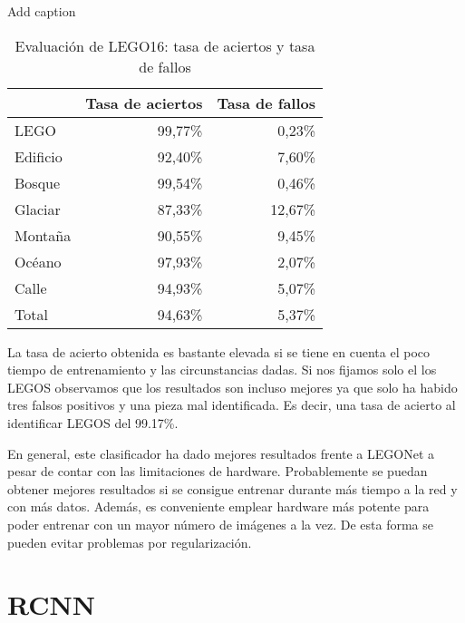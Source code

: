 \begin{table}[htbp]
  \centering
  \caption{Add caption}
    \begin{tabular}{|l|r|r|}
\cline{2-3}    \multicolumn{1}{r|}{} & \multicolumn{1}{l|}{Tasa de aciertos} & \multicolumn{1}{l|}{Tasa de fallos} \\
    \hline
    LEGO  & 99,77\% & 0,23\% \\
    \hline
    Edificio & 92,40\% & 7,60\% \\
    \hline
    Bosque & 99,54\% & 0,46\% \\
    \hline
    Glaciar & 87,33\% & 12,67\% \\
    \hline
    Montaña & 90,55\% & 9,45\% \\
    \hline
    Océano & 97,93\% & 2,07\% \\
    \hline
    Calle & 94,93\% & 5,07\% \\
    \hline
    Total & 94,63\% & 5,37\% \\
    \hline
    \end{tabular}%
  \label{tab:LEGO16 results2}%
  \caption{Evaluación de LEGO16: tasa de aciertos y tasa de fallos}
\end{table}%

La tasa de acierto obtenida es bastante elevada si se tiene en cuenta el poco tiempo de entrenamiento y las circunstancias dadas. Si nos fijamos solo el los LEGOS observamos que los resultados son incluso mejores ya que solo ha habido tres falsos positivos y una pieza mal identificada. Es decir, una tasa de acierto al identificar LEGOS del 99.17\%.

En general, este clasificador ha dado mejores resultados frente a LEGONet a pesar de contar con las limitaciones de hardware. Probablemente se puedan obtener mejores resultados si se consigue entrenar durante más tiempo a la red y con más datos. Además, es conveniente emplear hardware más potente para poder entrenar con un mayor número de imágenes a la vez. De esta forma se pueden evitar problemas por regularización.

\section{RCNN}
\label{sec:RCNN}
